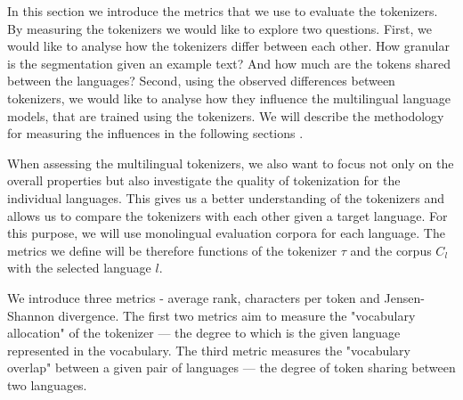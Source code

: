 

In this section we introduce the metrics that we use to evaluate the tokenizers. By measuring the tokenizers we would like to explore two questions. First, we would like to analyse how the tokenizers differ between each other. How granular is the segmentation given an example text? And how much are the tokens shared between the languages? Second, using the observed differences between tokenizers, we would like to analyse how they influence the multilingual language models, that are trained using the tokenizers. We will describe the methodology for measuring the influences in the following sections .

When assessing the multilingual tokenizers, we also want to focus not only on the overall properties but also investigate the quality of tokenization for the individual languages. This gives us a better understanding of the tokenizers and allows us to compare the tokenizers with each other given a target language. For this purpose, we will use monolingual evaluation corpora for each language. The metrics we define will be therefore functions of the tokenizer $\tau$ and the corpus $C_l$ with the selected language $l$. 

We introduce three metrics - average rank, characters per token and Jensen-Shannon divergence. The first two metrics aim to measure the "vocabulary allocation" of the tokenizer --- the degree to which is the given language represented in the vocabulary. The third metric measures the "vocabulary overlap" between a given pair of languages --- the degree of token sharing between two languages.


